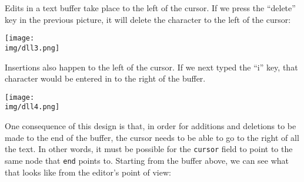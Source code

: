 \documentclass[12pt]{exam}
\begin{document}
\newpage
Edits in a text buffer take place to the left of the cursor. If we
press the ``delete'' key in the previous picture, it will delete the
character to the left of the cursor:
\begin{center}
  \texttt{[image: \\img/dll3.png]}
\end{center}\vspace{-2.5ex}
Insertions also happen to the left of the cursor. If we next typed the
``i'' key, that character would be entered in to the right of the
buffer.
\begin{center}
  \texttt{[image: \\img/dll4.png]}
\end{center}\vspace{-2.5ex}
One consequence of this design is that, in order for additions and
deletions to be made to the end of the buffer, the cursor needs to be
able to go to the right of all the text. In other words, it must be
possible for the \lstinline'cursor' field to point to the same node
that \lstinline'end' points to. Starting from the buffer above, we can
see what that looks like from the editor's point of view:
\end{document}

